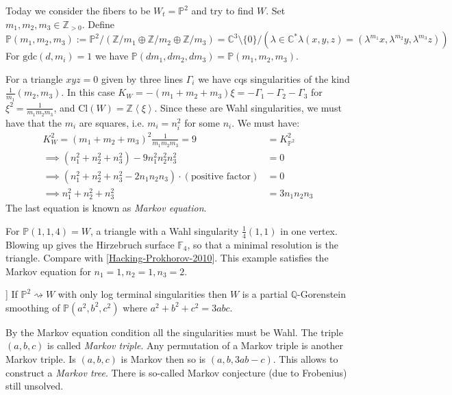 Today we consider the fibers to be $W_t=\mathbb{P}^2$ and
try to find $W$. Set $m_1,m_2,m_3\in\mathbb{Z}_{>0}$. Define
$$
\mathbb{P}(m_1,m_2,m_3):=
\mathbb{P}^2/(\mathbb{Z}/m_1\oplus\mathbb{Z}/m_2\oplus\mathbb{Z}/m_3)
=\mathbb{C}^3\setminus\{0\}/(\lambda\in\mathbb{C}^*\lambda(x,y,z)
=(\lambda^{m_1}x,\lambda^{m_2}y,\lambda^{m_3}z))
$$
For $\text{gdc}(d,m_i)=1$ we have
$\mathbb{P}(dm_1,dm_2,dm_3)=\mathbb{P}(m_1,m_2,m_3)$.

For a triangle $xyz=0$ given by three lines $\Gamma_i$ we have cqs singularities
of the kind $\frac{1}{m_1}(m_2,m_3)$. In this case
$K_W=-(m_1+m_2+m_3)\xi=-\Gamma_1-\Gamma_2-\Gamma_3$ for
$\xi^2=\frac{1}{m_1m_2m_3}$, and $\text{Cl}(W)=\mathbb{Z}\left<\xi\right>$.
Since these are Wahl singularities, we must have that the $m_i$ are squares,
i.e. $m_i=n_i^2$ for some $n_i$. We must have:
\begin{align*}
K_W^2=(m_1+m_2+m_3)^2\frac{1}{m_1m_2m_3}=9&=K^2_{\mathbb{P}^2}\\
\implies (n_1^2+n_2^2+n_3^2)-9n_1^2n_2^2n_3^2&=0\\
\implies (n_1^2+n_2^2+n_3^2-2n_1n_2n_3)\cdot(\text{positive factor})&=0\\
\implies n_1^2+n_2^2+n_3^2&=3n_1n_2n_3
\end{align*}
The last equation is known as {\it Markov equation}.

\begin{example}
\label{example-Hirzebruch-surface}
For $\mathbb{P}(1,1,4)=W$, a triangle with a Wahl singularity
$\frac{1}{4}(1,1)$ in one vertex. Blowing up gives the Hirzebruch surface
$\mathbb{F}_4$, so that a minimal resolution is the triangle. Compare with
[\href{https://arxiv.org/pdf/2504.19929}{Hacking-Prokhorov-2010}]. This example
satisfies the Markov equation for $n_1=1,n_2=1,n_3=2$.
\end{example}

\begin{theorem}[[HP2010]]
\label{theorem-HP2010}
If $\mathbb{P}^2\rightsquigarrow W$ with only log terminal singularities then
$W$ is a partial $\mathbb{Q}$-Gorenstein smoothing of $\mathbb{P}(a^2,b^2,c^2)$
where $a^2+b^2+c^2=3abc$.
\end{theorem}
By the Markov equation condition all the singularities must be Wahl. The triple
$(a,b,c)$ is called {\it Markov triple}. Any permutation of a Markov triple is
another Markov triple. Is $(a,b,c)$ is Markov then so is $(a,b,3ab-c)$. This
allows to construct a {\it Markov tree}. There is so-called Markov conjecture
(due to Frobenius) still unsolved.

